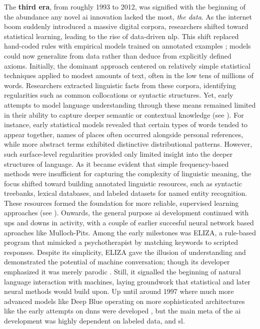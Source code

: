 \greensquare
The \textbf{third era}, from roughly 1993 to 2012, was signified with the beginning of
the abundance any novel \gls{ai} innovation lacked the most, \emph{the data}. As the internet boom suddenly introduced a massive digital corpora, researchers shifted toward statistical learning, leading to the rise of data-driven \gls{nlp}. This shift replaced hand-coded rules with empirical models trained on annotated examples \parencite{maas2023}; models could now generalize from data rather than deduce from explicitly defined axioms. Initially, the dominant approach centered on relatively simple statistical techniques applied to modest amounts of text, often in the low tens of millions of words. Researchers extracted linguistic facts from these corpora, identifying regularities such as common collocations or syntactic structures. Yet, early attempts to model language understanding through these means remained limited in their ability to capture deeper semantic or contextual knowledge (see \cite[129]{manning2022a}). For instance, early statistical models revealed that certain types of words tended to appear together, names of places often occurred alongside personal references, while more abstract terms exhibited distinctive distributional patterns. However, such surface-level regularities provided only limited insight into the deeper structures of language. As it became evident that simple frequency-based methods were insufficient for capturing the complexity of linguistic meaning, the focus shifted toward building annotated linguistic resources, such as syntactic treebanks, lexical databases, and labeled datasets for named entity recognition. These resources formed the foundation for more reliable, supervised learning approaches (see \cite[129]{manning2022a}). Onwards, the general purpose \gls{ai} development continued with ups and downs in activity, with a couple of earlier succesful neural network based aproaches like Mulloch-Pits. Among the early milestones was ELIZA, a rule-based program that mimicked a psychotherapist by matching keywords to scripted responses. Despite its simplicity, ELIZA gave the illusion of understanding and demonstrated the potential of machine conversation; though its developer emphasized it was merely parodic \parencite{toloka2023}. Still, it signalled the beginning of natural language interaction with machines, laying groundwork that statistical and later neural methods would build upon. Up until around 1997 where much more advanced models like Deep Blue operating on more sophisticated architectures like the early attempts on \glspl{dnn} were developed \parencite[197]{montanari2025}, but the main meta of the \gls{ai} development was highly dependent on labeled data, and \gls{sl}.

